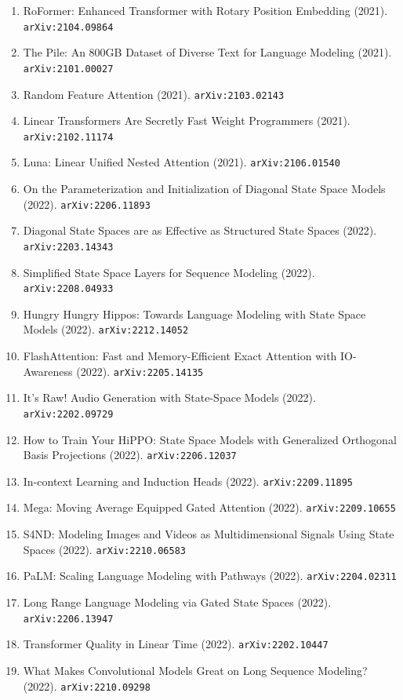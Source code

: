\documentclass[11pt]{article}
\begin{document}
\begin{enumerate}
  \item RoFormer: Enhanced Transformer with Rotary Position Embedding (2021). \texttt{arXiv:2104.09864}
  \item The Pile: An 800GB Dataset of Diverse Text for Language Modeling (2021). \texttt{arXiv:2101.00027}
  \item Random Feature Attention (2021). \texttt{arXiv:2103.02143}
  \item Linear Transformers Are Secretly Fast Weight Programmers (2021). \texttt{arXiv:2102.11174}
  \item Luna: Linear Unified Nested Attention (2021). \texttt{arXiv:2106.01540}
  \item On the Parameterization and Initialization of Diagonal State Space
  Models (2022). \texttt{arXiv:2206.11893}
  \item Diagonal State Spaces are as Effective as Structured State Spaces (2022). \texttt{arXiv:2203.14343}
  \item Simplified State Space Layers for Sequence Modeling (2022). \texttt{arXiv:2208.04933}
  \item Hungry Hungry Hippos: Towards Language Modeling with State Space Models (2022). \texttt{arXiv:2212.14052}
  \item FlashAttention: Fast and Memory-Efficient Exact Attention with
  IO-Awareness (2022). \texttt{arXiv:2205.14135}
  \item It's Raw! Audio Generation with State-Space Models (2022). \texttt{arXiv:2202.09729}
  \item How to Train Your HiPPO: State Space Models with Generalized Orthogonal
  Basis Projections (2022). \texttt{arXiv:2206.12037}
  \item In-context Learning and Induction Heads (2022). \texttt{arXiv:2209.11895}
  \item Mega: Moving Average Equipped Gated Attention (2022). \texttt{arXiv:2209.10655}
  \item S4ND: Modeling Images and Videos as Multidimensional Signals Using State
  Spaces (2022). \texttt{arXiv:2210.06583}
  \item PaLM: Scaling Language Modeling with Pathways (2022). \texttt{arXiv:2204.02311}
  \item Long Range Language Modeling via Gated State Spaces (2022). \texttt{arXiv:2206.13947}
  \item Transformer Quality in Linear Time (2022). \texttt{arXiv:2202.10447}
  \item What Makes Convolutional Models Great on Long Sequence Modeling? (2022). \texttt{arXiv:2210.09298}

\end{enumerate}
\end{document}
